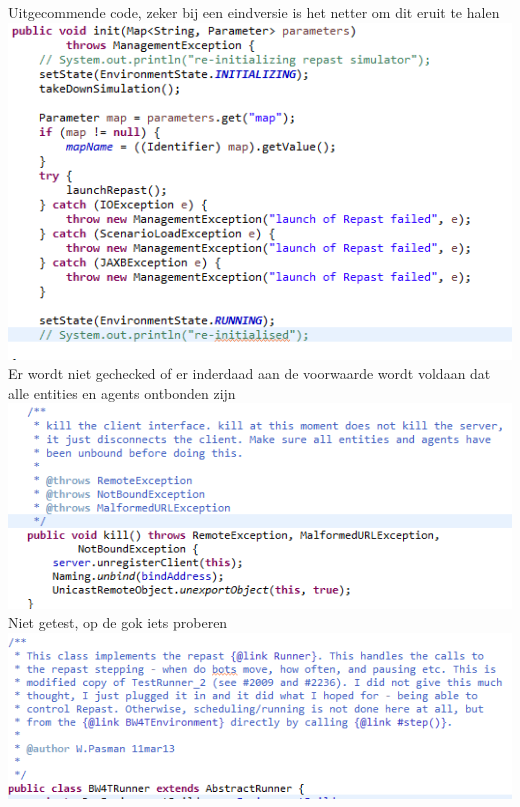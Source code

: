 \documentclass[11pt,a4paper]{article}
\begin{document}
Uitgecommende code, zeker bij een eindversie is het netter om dit eruit te halen \\
\includegraphics[width=\linewidth]{lelijkCode.png} \\ 

Er wordt niet gechecked of er inderdaad aan de voorwaarde wordt voldaan dat alle entities en agents ontbonden zijn\\
\includegraphics[width=\linewidth]{noEntityCheck.png} \\ 

Niet getest, op de gok iets proberen \\
\includegraphics[width=\linewidth]{notTested.png} \\ 
\end{document}

